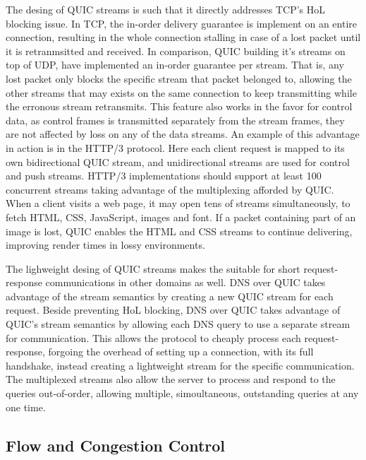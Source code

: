 \documentclass[english, 12pt, a4paper, elec, utf8, a-2b, online]{aaltothesis}
\begin{document}
The desing of QUIC streams is such that it directly addresses TCP's HoL blocking
issue. In TCP, the in-order delivery guarantee is implement on an entire connection,
resulting in the whole connection stalling in case of a lost packet until it is
retranmsitted and received. In comparison, QUIC building it's streams on top of
UDP, have implemented an in-order guarantee per stream. That is, any lost packet
only blocks the specific stream that packet belonged to, allowing the other streams
that may exists on the same connection to keep transmitting while the erronous
stream retransmits. This feature also works in the favor for control data,
as control frames is transmitted separately from the stream frames, they are not
affected by loss on any of the data streams\cite{rfc9000}. An example of this advantage
in action is in the HTTP/3 protocol. Here each client request is mapped to its own
bidirectional QUIC stream, and unidirectional streams are used for control and
push streams. HTTP/3 implementations should support at least 100 concurrent streams
taking advantage of the multiplexing afforded by QUIC\cite{rfc9114}. When a client
visits a web page, it may open tens of streams simultaneously, to fetch HTML, CSS,
JavaScript, images and font. If a packet containing part of an image is lost, QUIC
enables the HTML and CSS streams to continue delivering, improving render times
in lossy environments.

The lighweight desing of QUIC streams makes the suitable for short request-response
communications in other domains as well. DNS over QUIC takes advantage of the
stream semantics by creating a new QUIC stream for each request. Beside preventing
HoL blocking, DNS over QUIC takes advantage of QUIC's stream semantics by allowing
each DNS query to use a separate stream for communication. This allows the protocol
to cheaply process each request-response, forgoing the overhead of setting up a connection,
with its full handshake, instead creating a lightweight stream for the specific
communication. The multiplexed streams also allow the server to process and respond
to the queries out-of-order, allowing multiple, simoultaneous, outstanding queries
at any one time.

\subsection{Flow and Congestion Control}
\end{document}

